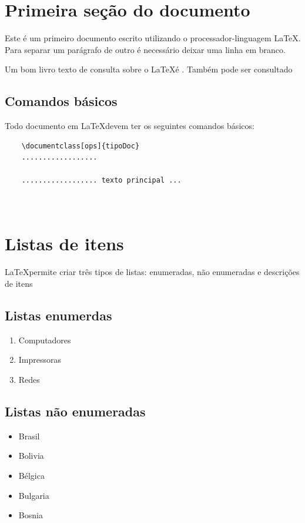 



\section{Primeira se\c{c}\~{a}o do documento}
Este \'{e} um primeiro documento escrito utilizando o processador-linguagem \LaTeX{}. Para separar um par\'{a}grafo de outro \'{e} necess\'{a}rio deixar uma linha em branco.

Um bom livro texto de consulta sobre o  \LaTeX \'{e} \cite{Kottwitz2011}. Tamb\'{e}m pode ser consultado \cite{Mittelbach2004}

    \subsection{Comandos b\'{a}sicos}
    Todo documento em  \LaTeX devem ter os seguintes comandos b\'{a}sicos:
    \begin{verbatim}
    \documentclass[ops]{tipoDoc}
    ..................
    
    .................. texto principal ...

    
    \end{verbatim}



\section{Listas de itens}
 \LaTeX permite criar tr\^{e}s tipos de listas: enumeradas, n\~{a}o enumeradas e descri\c{c}\~{o}es de itens
    \subsection{Listas enumerdas}

        \begin{enumerate}
        	\item Computadores
        	\item Impressoras
        	\item Redes
        \end{enumerate}



     \subsection{Listas n\~{a}o enumeradas}
       \begin{itemize}
       	\item Brasil
       	\item Bolivia
       	\item B\'{e}lgica
       	\item Bulgaria
       	\item Bosnia
       \end{itemize}



